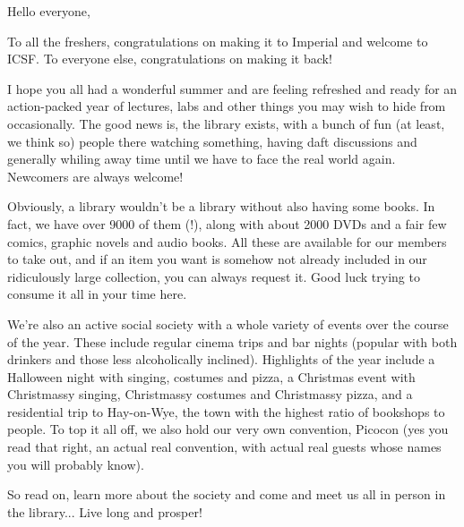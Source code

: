 Hello everyone,

To all the freshers, congratulations on making it to Imperial and welcome to ICSF. To everyone else, congratulations on making it back!

I hope you all had a wonderful summer and are feeling refreshed and ready for an action-packed year of lectures, labs and other things you may wish to hide from occasionally. The good news is, the library exists, with a bunch of fun (at least, we think so) people there watching something, having daft discussions and generally whiling away time until we have to face the real world again. Newcomers are always welcome!

Obviously, a library wouldn't be a library without also having some books. In fact, we have over 9000 of them (!), along with about 2000 DVDs and a fair few comics, graphic novels and audio books. All these are available for our members to take out, and if an item you want is somehow not already included in our ridiculously large collection, you can always request it. Good luck trying to consume it all in your time here.

We're also an active social society with a whole variety of events over the course of the year. These include regular cinema trips and bar nights (popular with both drinkers and those less alcoholically inclined). Highlights of the year include a Halloween night with singing, costumes and pizza, a Christmas event with Christmassy singing, Christmassy costumes and Christmassy pizza, and a residential trip to Hay-on-Wye, the town with the highest ratio of bookshops to people. To top it all off, we also hold our very own convention, Picocon (yes you read that right, an actual real convention, with actual real guests whose names you will probably know).

So read on, learn more about the society and come and meet us all in person in the library... Live long and prosper!